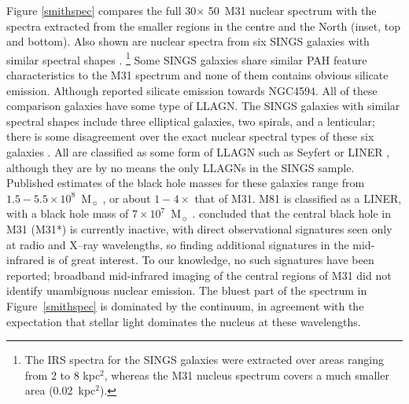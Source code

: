 \documentclass[useAMS,usenatbib,a4paper]{mn2e}
\begin{document}
Figure \ref{smithspec} compares the full 30\arcsec $\times$ 50\arcsec\ M31 nuclear spectrum with the spectra extracted from the smaller regions in the centre and the North (inset, top and bottom). Also shown are nuclear spectra
from six SINGS galaxies with similar spectral shapes \citep{Smith:2007lr}.%
\footnote{The IRS spectra for the SINGS galaxies were extracted over areas ranging from 2 to 8 kpc$^2$, whereas the M31
nucleus spectrum covers a much smaller area (0.02~kpc$^2$).}
Some SINGS galaxies share similar PAH feature characteristics to the M31 spectrum and none of them contains obvious silicate emission. Although \citet{Mason2012} reported silicate emission towards NGC4594. 
All of these comparison galaxies have some type of LLAGN.
The SINGS galaxies with similar spectral shapes include  three elliptical galaxies, two spirals, and a lenticular; there is some disagreement over the
exact nuclear spectral types of these six galaxies \citep{kennicutt03,Smith:2007lr, moustakas2010}.  All are classified as some form of LLAGN
such as Seyfert or LINER \citep[luminous AGNs were intentionally omitted from the SINGS sample;][]{kennicutt03}, although they are
by no means the only LLAGNs in the SINGS sample.
Published estimates of the black hole masses for these galaxies range from $1.5-5.5\times10^{8}$~M$_{\sun}$
\citep[for NGC~1316 and NGC~4595, respectively]{nowak08, kormendy88}, or about $1-4\times$ that of M31.
M81 is classified as a LINER, with a black hole mass of $7\times10^7$~M$_{\sun}$ \citep{devereux03}.
\citet{Li09} concluded that the central black hole in M31 (M31*) is currently inactive, with direct observational signatures seen only
at radio and X--ray wavelengths, so finding additional signatures in the mid-infrared is of great interest.
To our knowledge, no such signatures have been reported; broadband mid-infrared imaging of the central 
regions of M31 \citep{davidge06,Barmby2006lr} did not identify unambiguous nuclear emission. The bluest
part of the spectrum in Figure~\ref{smithspec} is dominated by the continuum, in agreement with the
expectation that stellar light dominates the nucleus at these wavelengths.
\end{document}
